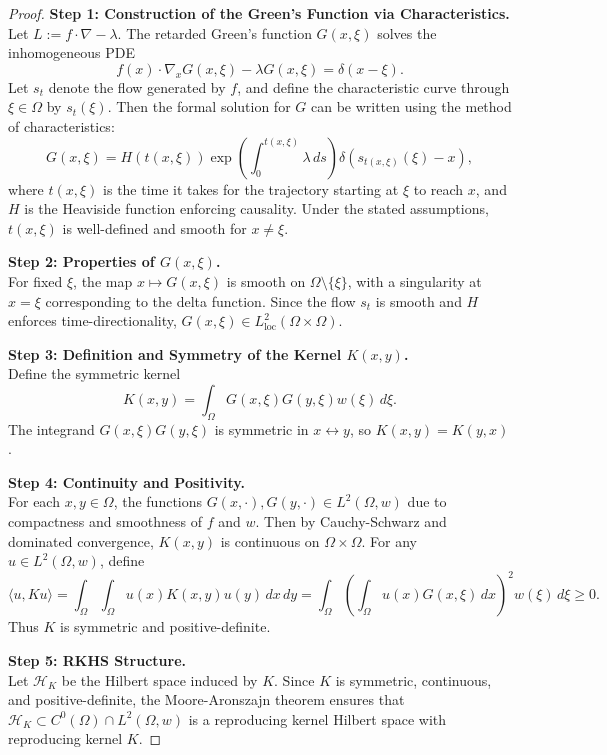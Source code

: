 \documentclass[11pt]{article}
\theoremstyle{plain}
\def\[{\begin{equation}}
\def\]{\end{equation}}
\begin{document}
\begin{proof}
\textbf{Step 1: Construction of the Green’s Function via Characteristics.} \\
Let $L := f \cdot \nabla - \lambda$. The retarded Green's function $G(x, \xi)$ solves the inhomogeneous PDE
\[
f(x) \cdot \nabla_x G(x, \xi) - \lambda G(x, \xi) = \delta(x - \xi).
\]
Let $s_t$ denote the flow generated by $f$, and define the characteristic curve through $\xi \in \Omega$ by $s_t(\xi)$. Then the formal solution for $G$ can be written using the method of characteristics:
\[
G(x, \xi) = H(t(x, \xi)) \exp\left( \int_0^{t(x, \xi)} \lambda \, ds \right) \delta(s_{t(x, \xi)}(\xi) - x),
\]
where $t(x, \xi)$ is the time it takes for the trajectory starting at $\xi$ to reach $x$, and $H$ is the Heaviside function enforcing causality. Under the stated assumptions, $t(x, \xi)$ is well-defined and smooth for $x \ne \xi$.

\vspace{0.5em}
\textbf{Step 2: Properties of $G(x, \xi)$.} \\
For fixed $\xi$, the map $x \mapsto G(x, \xi)$ is smooth on $\Omega \setminus \{\xi\}$, with a singularity at $x = \xi$ corresponding to the delta function. Since the flow $s_t$ is smooth and $H$ enforces time-directionality, $G(x, \xi) \in L^2_{\text{loc}}(\Omega \times \Omega)$.

\vspace{0.5em}
\textbf{Step 3: Definition and Symmetry of the Kernel $K(x, y)$.} \\
Define the symmetric kernel
\[
K(x, y) = \int_\Omega G(x, \xi) G(y, \xi) w(\xi) \, d\xi.
\]
The integrand $G(x, \xi) G(y, \xi)$ is symmetric in $x \leftrightarrow y$, so $K(x, y) = K(y, x)$.

\vspace{0.5em}
\textbf{Step 4: Continuity and Positivity.} \\
For each $x, y \in \Omega$, the functions $G(x, \cdot), G(y, \cdot) \in L^2(\Omega, w)$ due to compactness and smoothness of $f$ and $w$. Then by Cauchy-Schwarz and dominated convergence, $K(x, y)$ is continuous on $\Omega \times \Omega$. For any $u \in L^2(\Omega, w)$, define
\[
\langle u, Ku \rangle = \int_\Omega \int_\Omega u(x) K(x, y) u(y) \, dx \, dy = \int_\Omega \left( \int_\Omega u(x) G(x, \xi) \, dx \right)^2 w(\xi) \, d\xi \ge 0.
\]
Thus $K$ is symmetric and positive-definite.

\vspace{0.5em}
\textbf{Step 5: RKHS Structure.} \\
Let $\mathcal{H}_K$ be the Hilbert space induced by $K$. Since $K$ is symmetric, continuous, and positive-definite, the Moore-Aronszajn theorem ensures that $\mathcal{H}_K \subset C^0(\Omega) \cap L^2(\Omega, w)$ is a reproducing kernel Hilbert space with reproducing kernel $K$.

\end{proof}
\end{document}
